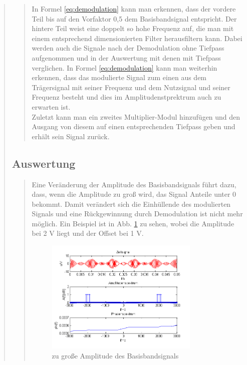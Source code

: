 \begin{quote}
\begin{quote}
        In Formel \ref{eq:demodulation} kann man erkennen, dass der vordere Teil
        bis auf den Vorfaktor 0,5 dem Basisbandsignal entspricht. Der hintere
        Teil weist eine doppelt so hohe Frequenz auf, die man mit einem
        entsprechend dimensionierten Filter herausfiltern kann.
        Dabei werden auch die Signale nach der Demodulation ohne Tiefpass
        aufgenommen und in der Auswertung mit denen mit Tiefpass verglichen.
        In Formel \ref{eq:demodulation} kann man weiterhin erkennen, dass das
        modulierte Signal zum einen aus dem Trägersignal mit seiner Frequenz und
        dem Nutzsignal und seiner Frequenz besteht und dies im
        Amplitudenstprektrum auch zu erwarten ist.\\
        Zuletzt kann man ein
        zweites Multiplier-Modul hinzufügen und den Ausgang von diesem auf einen entsprechenden Tiefpass geben und erhält sein Signal zurück.
        
    \end{quote}
    
    
    \subsection{Auswertung}
    \begin{quote}
        Eine Veränderung der Amplitude des Basisbandsignals führt dazu, dass,
        wenn die Amplitude zu groß wird, das Signal Anteile unter 0 bekommt.
        Damit verändert sich die Einhüllende des modulierten Signals und eine
        Rückgewinnung durch Demodulation ist nicht mehr möglich. Ein Beispiel
        ist in Abb. \ref{fig:Ampl} zu sehen, wobei die Amplitude bei 2 V liegt
        und der Offset bei 1 V.
        
    \begin{figure}[H]
		\begin{center}
			\includegraphics[width=0.8\textwidth]{Bilder/Cos_zugrosseAmpl}
		\end{center}
		\caption{zu große Amplitude des Basisbandsignals}
		\label{fig:Ampl}
	\end{figure}
	

\end{quote}
\end{quote}
